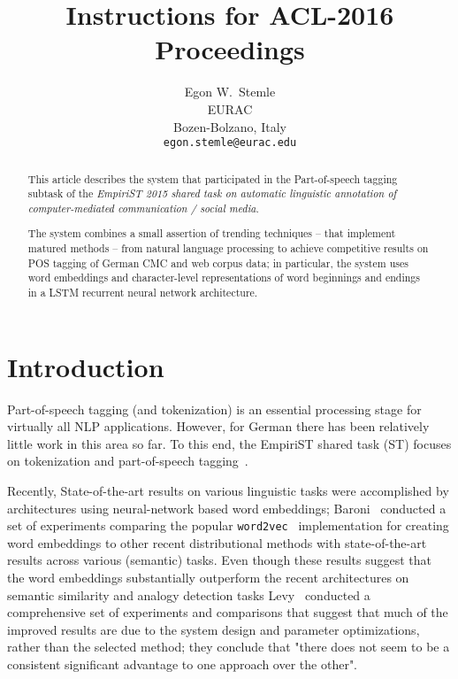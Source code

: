 \documentclass[11pt]{article}
\title{Instructions for ACL-2016 Proceedings}
\author{Egon W.~Stemle \\
  EURAC \\
  Bozen-Bolzano, Italy \\
  {\tt egon.stemle@eurac.edu}} %
\date{}
\begin{document}
\maketitle
\begin{abstract}
    This article describes the system that participated in the Part-of-speech
    tagging subtask of the \emph{EmpiriST 2015 shared task on automatic
    linguistic annotation of computer-mediated communication / social
    media}.

    The system combines a small assertion of trending techniques -- that
    implement matured methods -- from natural language processing to achieve
    competitive results on POS tagging of German CMC and web corpus data; in
    particular, the system uses word embeddings and character-level
    representations of word beginnings and endings in a LSTM recurrent neural
    network architecture.

    
\end{abstract}

\section{Introduction}
\label{sec:intro}

Part-of-speech tagging (and tokenization) is an essential processing stage for
virtually all NLP applications. However, for German there has been relatively
little work in this area so far. To this end, the EmpiriST shared task (ST)
focuses on tokenization and part-of-speech tagging~\cite{empirist2016}.

Recently, State-of-the-art results on various linguistic tasks were
accomplished by architectures using neural-network based word embeddings;
Baroni~ conducted a set of
experiments comparing the popular
\texttt{word2vec}~\cite{DBLP:journals/corr/abs-1301-3781,arXiv:1310.4546}
implementation for creating word embeddings to other recent distributional
methods with state-of-the-art results across various (semantic) tasks.  Even
though these results suggest that the word embeddings substantially outperform
the recent architectures on semantic similarity and analogy detection tasks
Levy~ conducted a comprehensive set of experiments and
comparisons that suggest that much of the improved results are due to the
system design and parameter optimizations, rather than the selected method;
they conclude that "there does not seem to be a consistent significant
advantage to one approach over the other".
\end{document}
